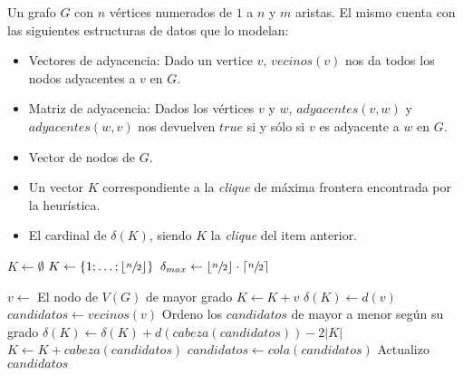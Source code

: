 \begin{pseudocodigo}
    \Require Un grafo $G$ con $n$ v\'ertices numerados de $1$ a $n$ y $m$ aristas. El mismo
        cuenta con las siguientes estructuras de datos que lo modelan:
        \begin{itemize}
            \item Vectores de adyacencia: Dado un vertice $v$, $vecinos(v)$ nos da todos los
                nodos adyacentes a $v$ en $G$.

            \item Matriz de adyacencia: Dados los v\'ertices $v$ y $w$, $adyacentes(v,w)$ y
                $adyacentes(w,v)$ nos devuelven $true$ si y s\'olo si $v$ es adyacente
                a $w$ en $G$.

            \item Vector de nodos de $G$.
        \end{itemize}
    \Ensure\Statex
        \begin{itemize}
            \item Un vector $K$ correspondiente a la \emph{clique} de m\'axima frontera
                encontrada por la heur\'istica.

            \item El cardinal de $\delta(K)$, siendo $K$ la \emph{clique} del item anterior.
        \end{itemize}
    \Statex

    \State $K \gets \emptyset$ 
     
        \State $K \gets \left\{1;\dots;\left\lfloor\sfrac{n}{2}\right\rfloor\right\}$ 
        \State $\delta_{max} \gets \left\lfloor\sfrac{n}{2}\right\rfloor\cdot
            \left\lceil\sfrac{n}{2}\right\rceil$ 
        \Statex

    \Else
        \State $v \gets$ El nodo de $V(G)$ de mayor grado 
        \State $K \gets K+v$ 
        \State $\delta(K) \gets d(v)$ 
        \State $candidatos \gets vecinos(v)$ 
        \State Ordeno los $candidatos$ de mayor a menor seg\'un su grado 
         
            \State $\delta(K) \gets \delta(K) + d(cabeza(candidatos)) - 2|K|$ 
            \State $K \gets K+cabeza(candidatos)$ 
            \State $candidatos \gets cola(candidatos)$ 
            \State Actualizo $candidatos$ 
        \EndWhile {}
    \EndIf {}

    \State {} 
    \Statex
    \Statex {}
\end{pseudocodigo}

